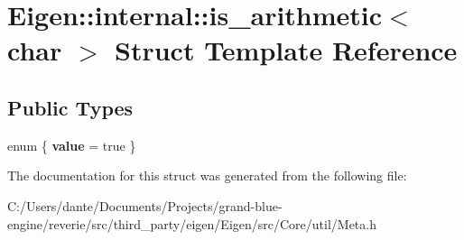 \hypertarget{struct_eigen_1_1internal_1_1is__arithmetic_3_01char_01_4}{}\section{Eigen\+::internal\+::is\+\_\+arithmetic$<$ char $>$ Struct Template Reference}
\label{struct_eigen_1_1internal_1_1is__arithmetic_3_01char_01_4}
\subsection*{Public Types}
\begin{DoxyCompactItemize}
\item 
\mbox{\label{struct_eigen_1_1internal_1_1is__arithmetic_3_01char_01_4_a910e1063d1f65c9b9b6be92fcbce9424}} 
enum \{ {\bfseries value} = true
 \}
\end{DoxyCompactItemize}


The documentation for this struct was generated from the following file\+:\begin{DoxyCompactItemize}
\item 
C\+:/\+Users/dante/\+Documents/\+Projects/grand-\/blue-\/engine/reverie/src/third\+\_\+party/eigen/\+Eigen/src/\+Core/util/Meta.\+h\end{DoxyCompactItemize}
